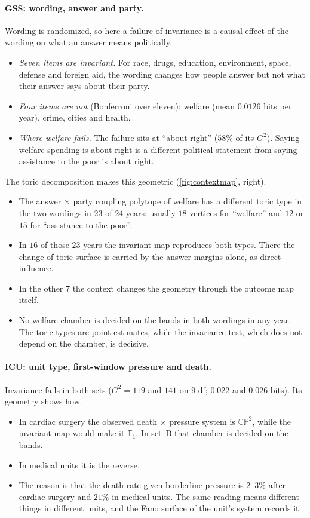 \documentclass[11pt]{article}
\theoremstyle{definition}
\theoremstyle{remark}
\begin{document}
\paragraph{GSS: wording, answer and party.} Wording is randomized, so here a failure of invariance is a causal effect of the wording on
what an answer means politically.
\begin{itemize}[leftmargin=*,nosep]
\item \emph{Seven items are invariant.} For race, drugs, education, environment, space, defense and foreign aid, the wording changes how people answer but not what their answer says about their party.
\item \emph{Four items are not} (Bonferroni over eleven): welfare (mean $0.0126$ bits per year), crime, cities and health.
\item \emph{Where welfare fails.} The failure sits at ``about right'' ($58\%$ of its $G^2$). Saying welfare spending is about right is a
  different political statement from saying assistance to the poor is about right.
\end{itemize}
The toric decomposition makes this geometric (\cref{fig:contextmap}, right).
\begin{itemize}[leftmargin=*,nosep]
\item The answer $\times$ party coupling polytope of welfare has a different toric type in the two wordings in $23$ of $24$ years:
  usually $18$ vertices for ``welfare'' and $12$ or $15$ for ``assistance to the poor''.
\item In $16$ of those $23$ years the invariant map reproduces both types. There the change of toric surface is carried by the answer
  margins alone, as direct influence.
\item In the other $7$ the context changes the geometry through the outcome map itself.
\item No welfare chamber is decided on the bands in both wordings in any year. The toric types are point estimates, while the invariance
  test, which does not depend on the chamber, is decisive.
\end{itemize}

\paragraph{ICU: unit type, first-window pressure and death.} Invariance fails in both sets ($G^2=119$ and $141$ on $9$ df;
$0.022$ and $0.026$ bits). Its geometry shows how.
\begin{itemize}[leftmargin=*,nosep]
\item In cardiac surgery the observed death $\times$ pressure system is $\mathbb{CP}^2$, while the invariant map would make it
  $\mathbb F_1$. In set~B that chamber is decided on the bands.
\item In medical units it is the reverse.
\item The reason is that the death rate given borderline pressure is $2$--$3\%$ after cardiac surgery and $21\%$ in medical units.
  The same reading means different things in different units, and the Fano surface of the unit's system records it.
\end{itemize}
\end{document}
